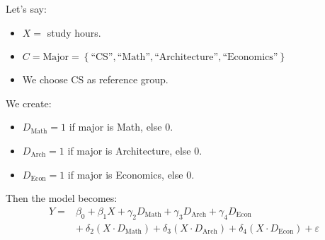 \begin{examplebox}
    Let's say:
    \begin{itemize}
        \item $X =$ study hours.
        \item $C = \text{Major} = \left\{\text{``CS''}, \text{``Math''}, \text{``Architecture''}, \text{``Economics''}\right\}$
        \item We choose CS as reference group.
    \end{itemize}
    We create:
    \begin{itemize}
        \item $D_{\text{Math}} = 1$ if major is Math, else 0.
        \item $D_{\text{Arch}} = 1$ if major is Architecture, else 0.
        \item $D_{\text{Econ}} = 1$ if major is Economics, else 0.
    \end{itemize}
    Then the model becomes:
    \begin{equation*}
        \begin{array}{rl}
            Y = & \beta_0 + \beta_1 X + \gamma_2 D_{\text{Math}} + \gamma_3 D_{\text{Arch}} + \gamma_4 D_{\text{Econ}} \\ [.5em]
            & +\: \delta_2 (X \cdot D_{\text{Math}}) + \delta_3 (X \cdot D_{\text{Arch}}) + \delta_4 (X \cdot D_{\text{Econ}}) + \varepsilon
        \end{array}
    \end{equation*}
\end{examplebox}